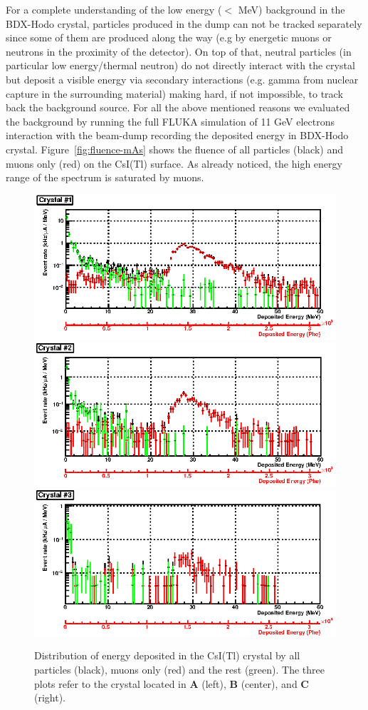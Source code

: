 For a complete understanding of the low energy ($<$ MeV) background in the BDX-Hodo crystal, particles produced in the dump can not be tracked separately since some of them are produced along the way (e.g by energetic muons or neutrons in the proximity of the detector). On top of that, neutral particles (in particular low energy/thermal neutron) do not directly interact with the crystal but deposit a visible energy via secondary interactions (e.g. gamma from nuclear capture in the surrounding material) making hard, if not impossible,  to track back the background source. For all the above mentioned reasons we evaluated the background by running the  full FLUKA simulation of  11 GeV electrons interaction with the beam-dump recording  the deposited energy in BDX-Hodo crystal. 
Figure~\ref{fig:fluence-mAs} shows the fluence of all particles (black) and muons only (red) on the CsI(Tl) surface. As already noticed, the high energy range of the spectrum is saturated by muons. 
\begin{figure}[h!] 
\center
\includegraphics[width=12.0cm]{figs/Edep1.eps}
\includegraphics[width=12.0cm]{figs/Edep2.eps} 
\includegraphics[width=12.0cm]{figs/Edep3.eps}
\caption {Distribution of energy deposited in the CsI(Tl) crystal by all particles (black), muons only (red) and the rest (green). The three plots refer to the crystal located in {\bf A} (left),  {\bf B} (center), and {\bf C} (right).}
\label{fig:edep}
\end{figure}
